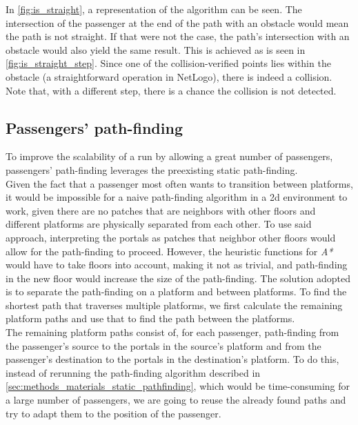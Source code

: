 In \autoref{fig:is_straight}, a representation of the algorithm can be seen. The intersection of the passenger at the end of the path with an obstacle would mean the path is not straight. If that were not the case, the path's intersection with an obstacle would also yield the same result. This is achieved as is seen in \autoref{fig:is_straight_step}. Since one of the collision-verified points lies within the obstacle (a straightforward operation in NetLogo), there is indeed a collision. Note that, with a different step, there is a chance the collision is not detected.

\subsection {Passengers' path-finding}

To improve the scalability of a run by allowing a great number of passengers, passengers' path-finding leverages the preexisting static path-finding.  \\
Given the fact that a passenger most often wants to transition between platforms, it would be impossible for a naive path-finding algorithm in a 2d environment to work, given there are no patches that are neighbors with other floors and different platforms are physically separated from each other. To use said approach, interpreting the portals as patches that neighbor other floors would allow for the path-finding to proceed. However, the heuristic functions for \textit{A*} would have to take floors into account, making it not as trivial, and path-finding in the new floor would increase the size of the path-finding. The solution adopted is to separate the path-finding on a platform and between platforms. To find the shortest path that traverses multiple platforms, we first calculate the remaining platform paths and use that to find the path between the platforms.\\

The remaining platform paths consist of, for each passenger, path-finding from the passenger's source to the portals in the source's platform and from the passenger's destination to the portals in the destination's platform. To do this, instead of rerunning the path-finding algorithm described in \autoref{sec:methods_materials_static_pathfinding}, which would be time-consuming for a large number of passengers, we are going to reuse the already found paths and try to adapt them to the position of the passenger. \\

